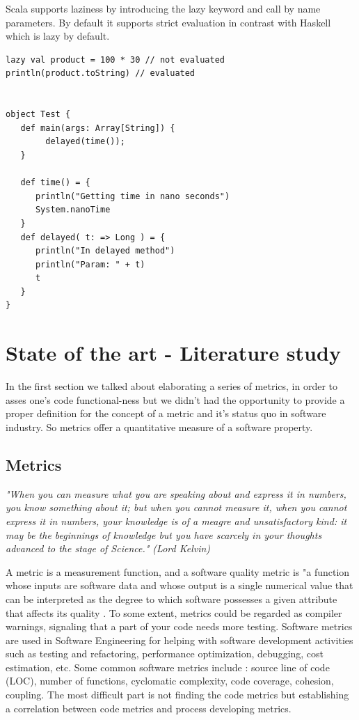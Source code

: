 \documentclass{article}
\begin{document}
Scala supports laziness by introducing the lazy keyword and call by name parameters. By default it supports strict evaluation in contrast with Haskell which is lazy by default.

\begin{lstlisting}
lazy val product = 100 * 30 // not evaluated
println(product.toString) // evaluated 


object Test {
   def main(args: Array[String]) {
        delayed(time());
   }

   def time() = {
      println("Getting time in nano seconds")
      System.nanoTime
   }
   def delayed( t: => Long ) = {
      println("In delayed method")
      println("Param: " + t)
      t
   }
}

\end{lstlisting}

\section {State of the art - Literature study}
In the first section we talked about elaborating a series of metrics, in order to asses one's code functional-ness but we didn't had the opportunity to provide a proper definition for the concept of a metric and it's status quo in software industry. So metrics offer a quantitative measure of a software property. 

\subsection{Metrics}

\textit{"When you can measure what you are speaking about and express it in numbers, you know something about it; but when you cannot measure it, when you cannot express it in numbers, your knowledge is of a meagre and unsatisfactory kind: it may be the beginnings of knowledge but you have scarcely in your thoughts advanced to the stage of Science." (Lord Kelvin)}\par \par

A metric is a measurement function, and a software quality metric is "a function whose inputs are software data and whose output is a single numerical value that can be interpreted as the degree to which software possesses a given attribute that affects its quality \cite{Kaner04softwareengineering}. To some extent, metrics could be regarded as compiler warnings, signaling that a part of your code needs more testing. Software metrics are used in Software Engineering for helping with software development activities such as testing and refactoring, performance optimization, debugging, cost estimation, etc. Some common software metrics include : source line of code (LOC), number of functions, cyclomatic complexity, code coverage, cohesion, coupling. The most difficult part is not finding the code metrics but establishing a correlation between code metrics and process developing metrics. \par
\end{document}
